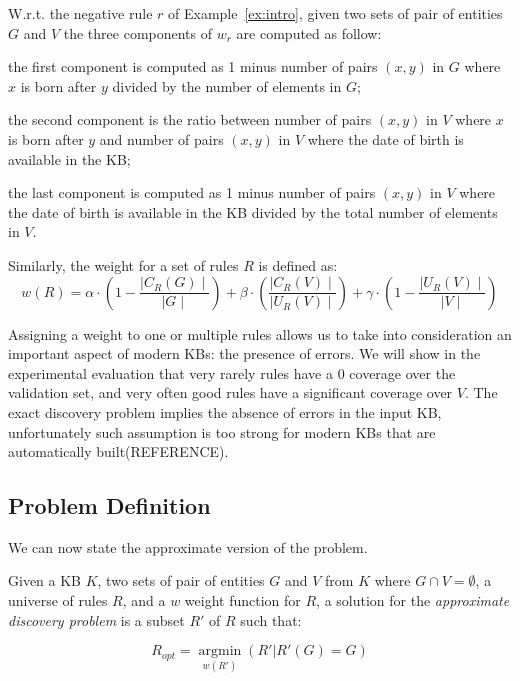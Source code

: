\begin{myExample}
	W.r.t. the negative rule $r$ of Example~\ref{ex:intro}, given two sets of pair of entities $G$ and $V$ the three components of $w_r$ are computed as follow:
	\begin{inparaenum}[\itshape(i)]
		\item the first component is computed as 1 minus number of pairs $(x,y)$ in $G$ where
		$x$ is born after $y$ divided by the number of elements in $G$;
		\item the second component is the ratio between number of pairs $(x,y)$ in $V$ where $x$ is born after $y$ and number of pairs $(x,y)$ in $V$ where the date of birth is available in the KB;
		\item the last component is computed as 1 minus number of pairs $(x,y)$ in $V$ where the date of birth is available in the KB divided by the total number of elements in $V$.
	\end{inparaenum}
\end{myExample}
	

Similarly, the weight for a set of rules $R$ is defined as:
\begin{equation*}
w(R) = \alpha \cdot (1-\frac{\mid C_{R}(G)\mid}{\mid G \mid}) +\beta \cdot (\frac{\mid C_{R}(V) \mid}{\mid U_{R}(V)\mid})  +\gamma \cdot (1-\frac{\mid U_{R}(V)\mid}{\mid V \mid})
\end{equation*}

Assigning a weight to one or multiple rules allows us to take into consideration an important aspect of modern KBs: the presence of errors. We will show in the experimental evaluation that very rarely rules have a $0$ coverage over the validation set, and very often good rules have a significant coverage over $V$. The exact discovery problem implies the absence of errors in the input KB, unfortunately such assumption is too strong for modern KBs that are automatically built(REFERENCE).

\subsection{Problem Definition}
We can now state the approximate version of the problem.


Given a KB $K$, two sets of pair of entities $G$ and $V$ from $K$ where $G \cap V = \emptyset$, a universe of rules $R$, and a $w$ weight function for $R$,
a solution for the \emph{approximate discovery problem} is a subset $R'$ of $R$  such that:

$$R_{opt}=\underset{w(R')}{\operatorname{argmin}}(R'|R'(G) = G)$$


